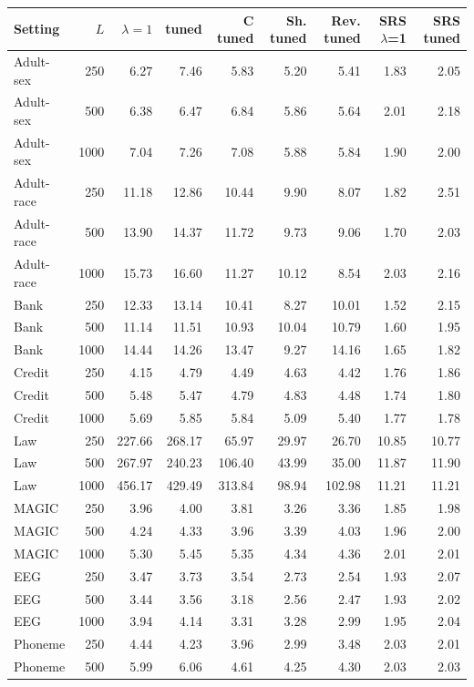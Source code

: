 \begin{tabular}{lrrrrrrrr}
\toprule
Setting & $L$ & $\lambda=1$ & tuned & C tuned & Sh. tuned & Rev. tuned & SRS $\lambda$=1 & SRS tuned \\
\midrule
Adult-sex & 250 & 6.27 & 7.46 & 5.83 & 5.20 & 5.41 & 1.83 & 2.05 \\
Adult-sex & 500 & 6.38 & 6.47 & 6.84 & 5.86 & 5.64 & 2.01 & 2.18 \\
Adult-sex & 1000 & 7.04 & 7.26 & 7.08 & 5.88 & 5.84 & 1.90 & 2.00 \\
Adult-race & 250 & 11.18 & 12.86 & 10.44 & 9.90 & 8.07 & 1.82 & 2.51 \\
Adult-race & 500 & 13.90 & 14.37 & 11.72 & 9.73 & 9.06 & 1.70 & 2.03 \\
Adult-race & 1000 & 15.73 & 16.60 & 11.27 & 10.12 & 8.54 & 2.03 & 2.16 \\
Bank & 250 & 12.33 & 13.14 & 10.41 & 8.27 & 10.01 & 1.52 & 2.15 \\
Bank & 500 & 11.14 & 11.51 & 10.93 & 10.04 & 10.79 & 1.60 & 1.95 \\
Bank & 1000 & 14.44 & 14.26 & 13.47 & 9.27 & 14.16 & 1.65 & 1.82 \\
Credit & 250 & 4.15 & 4.79 & 4.49 & 4.63 & 4.42 & 1.76 & 1.86 \\
Credit & 500 & 5.48 & 5.47 & 4.79 & 4.83 & 4.48 & 1.74 & 1.80 \\
Credit & 1000 & 5.69 & 5.85 & 5.84 & 5.09 & 5.40 & 1.77 & 1.78 \\
Law & 250 & 227.66 & 268.17 & 65.97 & 29.97 & 26.70 & 10.85 & 10.77 \\
Law & 500 & 267.97 & 240.23 & 106.40 & 43.99 & 35.00 & 11.87 & 11.90 \\
Law & 1000 & 456.17 & 429.49 & 313.84 & 98.94 & 102.98 & 11.21 & 11.21 \\
MAGIC & 250 & 3.96 & 4.00 & 3.81 & 3.26 & 3.36 & 1.85 & 1.98 \\
MAGIC & 500 & 4.24 & 4.33 & 3.96 & 3.39 & 4.03 & 1.96 & 2.00 \\
MAGIC & 1000 & 5.30 & 5.45 & 5.35 & 4.34 & 4.36 & 2.01 & 2.01 \\
EEG & 250 & 3.47 & 3.73 & 3.54 & 2.73 & 2.54 & 1.93 & 2.07 \\
EEG & 500 & 3.44 & 3.56 & 3.18 & 2.56 & 2.47 & 1.93 & 2.02 \\
EEG & 1000 & 3.94 & 4.14 & 3.31 & 3.28 & 2.99 & 1.95 & 2.04 \\
Phoneme & 250 & 4.44 & 4.23 & 3.96 & 2.99 & 3.48 & 2.03 & 2.01 \\
Phoneme & 500 & 5.99 & 6.06 & 4.61 & 4.25 & 4.30 & 2.03 & 2.03 \\

\end{tabular}
